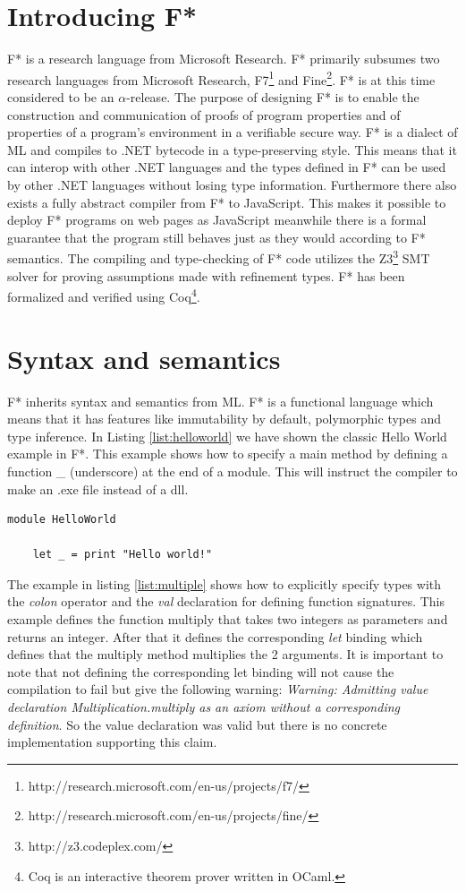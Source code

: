 \documentclass[twosided]{report}
\begin{document}
\section{Introducing F*}
F* is a research language from Microsoft Research. F* primarily subsumes two research languages from Microsoft Research, F7\footnote{http://research.microsoft.com/en-us/projects/f7/} and Fine\footnote{http://research.microsoft.com/en-us/projects/fine/}. F* is at this time considered to be an $\alpha$-release. The purpose of designing F* is to enable the construction and communication of proofs of program properties and of properties of a program's environment in a verifiable secure way. F* is a dialect of ML and compiles to .NET bytecode in a type-preserving style. This means that it can interop with other .NET languages and the types defined in F* can be used by other .NET languages without losing type information. Furthermore there also exists a fully abstract compiler from F* to JavaScript. This makes it possible to deploy F* programs on web pages as JavaScript meanwhile there is a formal guarantee that the program still behaves just as they would according to F* semantics. The compiling and type-checking of F* code utilizes the Z3\footnote{http://z3.codeplex.com/} SMT solver for proving assumptions made with refinement types. F* has been formalized and verified using Coq\footnote{Coq is an interactive theorem prover written in OCaml.}.

\section{Syntax and semantics}
F* inherits syntax and semantics from ML. F* is a functional language which means that it has features like immutability by default, polymorphic types and type inference. In Listing \ref{list:helloworld} we have shown the classic Hello World example in F*. This example shows how to specify a main method by defining a function \_ (underscore) at the end of a module. This will instruct the compiler to make an .exe file instead of a dll.

\begin{lstlisting}[style=fstar, caption={Hello World example in F*}, label={list:helloworld}]
	module HelloWorld
	
	let _ = print "Hello world!"
\end{lstlisting}

The example in listing \ref{list:multiple} shows how to explicitly specify types with the \emph{colon} operator and the \emph{val} declaration for defining function signatures. This example defines the function multiply that takes two integers as parameters and returns an integer. After that it defines the corresponding \emph{let} binding which defines that the multiply method multiplies the 2 arguments. It is important to note that not defining the corresponding let binding will not cause the compilation to fail but give the following warning: \emph{Warning: Admitting value declaration Multiplication.multiply as an axiom without a corresponding definition}. So the value declaration was valid but there is no concrete implementation supporting this claim.
\end{document}
